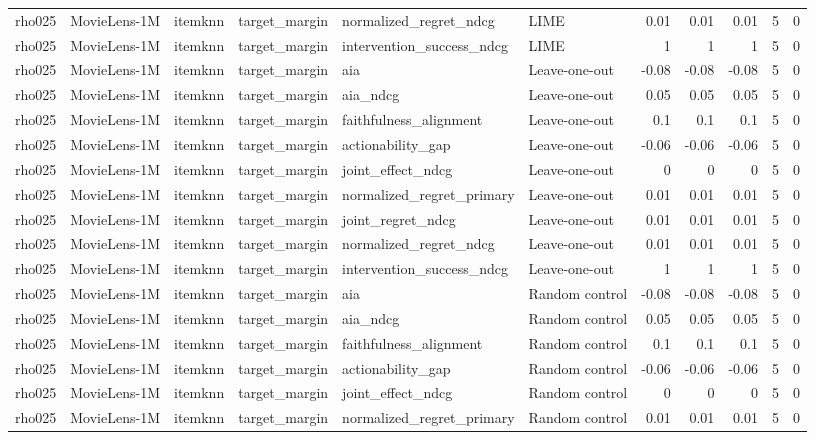 \begin{table}[t]
{\begin{tabular}{llllllrrrrr}
rho025 & MovieLens-1M & itemknn & target\_margin & normalized\_regret\_ndcg & LIME & 0.01 & 0.01 & 0.01 & 5 & 0 \\
rho025 & MovieLens-1M & itemknn & target\_margin & intervention\_success\_ndcg & LIME & 1 & 1 & 1 & 5 & 0 \\
rho025 & MovieLens-1M & itemknn & target\_margin & aia & Leave-one-out & -0.08 & -0.08 & -0.08 & 5 & 0 \\
rho025 & MovieLens-1M & itemknn & target\_margin & aia\_ndcg & Leave-one-out & 0.05 & 0.05 & 0.05 & 5 & 0 \\
rho025 & MovieLens-1M & itemknn & target\_margin & faithfulness\_alignment & Leave-one-out & 0.1 & 0.1 & 0.1 & 5 & 0 \\
rho025 & MovieLens-1M & itemknn & target\_margin & actionability\_gap & Leave-one-out & -0.06 & -0.06 & -0.06 & 5 & 0 \\
rho025 & MovieLens-1M & itemknn & target\_margin & joint\_effect\_ndcg & Leave-one-out & 0 & 0 & 0 & 5 & 0 \\
rho025 & MovieLens-1M & itemknn & target\_margin & normalized\_regret\_primary & Leave-one-out & 0.01 & 0.01 & 0.01 & 5 & 0 \\
rho025 & MovieLens-1M & itemknn & target\_margin & joint\_regret\_ndcg & Leave-one-out & 0.01 & 0.01 & 0.01 & 5 & 0 \\
rho025 & MovieLens-1M & itemknn & target\_margin & normalized\_regret\_ndcg & Leave-one-out & 0.01 & 0.01 & 0.01 & 5 & 0 \\
rho025 & MovieLens-1M & itemknn & target\_margin & intervention\_success\_ndcg & Leave-one-out & 1 & 1 & 1 & 5 & 0 \\
rho025 & MovieLens-1M & itemknn & target\_margin & aia & Random control & -0.08 & -0.08 & -0.08 & 5 & 0 \\
rho025 & MovieLens-1M & itemknn & target\_margin & aia\_ndcg & Random control & 0.05 & 0.05 & 0.05 & 5 & 0 \\
rho025 & MovieLens-1M & itemknn & target\_margin & faithfulness\_alignment & Random control & 0.1 & 0.1 & 0.1 & 5 & 0 \\
rho025 & MovieLens-1M & itemknn & target\_margin & actionability\_gap & Random control & -0.06 & -0.06 & -0.06 & 5 & 0 \\
rho025 & MovieLens-1M & itemknn & target\_margin & joint\_effect\_ndcg & Random control & 0 & 0 & 0 & 5 & 0 \\
rho025 & MovieLens-1M & itemknn & target\_margin & normalized\_regret\_primary & Random control & 0.01 & 0.01 & 0.01 & 5 & 0 \\

\end{tabular}}
\end{table}
